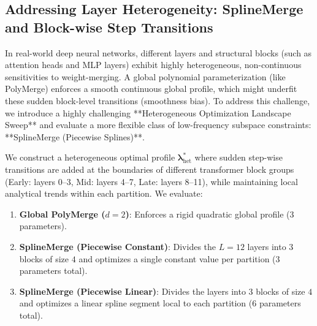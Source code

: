 \subsection{Addressing Layer Heterogeneity: SplineMerge and Block-wise Step Transitions}
In real-world deep neural networks, different layers and structural blocks (such as attention heads and MLP layers) exhibit highly heterogeneous, non-continuous sensitivities to weight-merging. A global polynomial parameterization (like PolyMerge) enforces a smooth continuous global profile, which might underfit these sudden block-level transitions (smoothness bias). To address this challenge, we introduce a highly challenging **Heterogeneous Optimization Landscape Sweep** and evaluate a more flexible class of low-frequency subspace constraints: **SplineMerge (Piecewise Splines)**.

We construct a heterogeneous optimal profile $\boldsymbol{\lambda}^*_{\text{het}}$ where sudden step-wise transitions are added at the boundaries of different transformer block groups (Early: layers 0--3, Mid: layers 4--7, Late: layers 8--11), while maintaining local analytical trends within each partition. We evaluate:
\begin{enumerate}
    \item \textbf{Global PolyMerge ($d=2$)}: Enforces a rigid quadratic global profile ($3$ parameters).
    \item \textbf{SplineMerge (Piecewise Constant)}: Divides the $L=12$ layers into $3$ blocks of size $4$ and optimizes a single constant value per partition ($3$ parameters total).
    \item \textbf{SplineMerge (Piecewise Linear)}: Divides the layers into $3$ blocks of size $4$ and optimizes a linear spline segment local to each partition ($6$ parameters total).
\end{enumerate}

